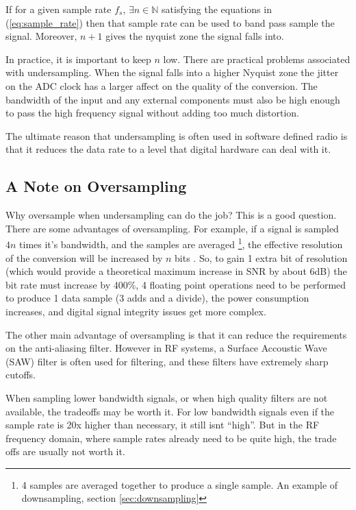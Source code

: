 \documentclass[a4paper, 12pt, notitlepage]{article}
\begin{document}
If for a given sample rate $f_s$, $\exists n \in \mathbb{N}$ satisfying the equations in (\ref{eq:sample_rate}) then that sample rate can be used to band pass sample the signal.  Moreover, $n+1$ gives the nyquist zone the signal falls into.

In practice, it is important to keep $n$ low.  There are practical problems associated with undersampling.  When the signal falls into a higher Nyquist zone the jitter on the ADC clock has a larger affect on the quality of the conversion.  The bandwidth of the input and any external components must also be high enough to pass the high frequency signal without adding too much distortion.

The ultimate reason that undersampling is often used in software defined radio is that it reduces the data rate to a level that digital hardware can deal with it.

\subsection{A Note on Oversampling}
Why oversample when undersampling can do the job\cite{why_oversample}?  This is a good question.  There are some advantages of oversampling.  For example, if a signal is sampled $4n$ times it's bandwidth, and the samples are averaged \footnote{4 samples are averaged together to produce a single sample.  An example of downsampling, section \ref{sec:downsampling}}, the effective resolution of the conversion will be increased by $n$ bits \cite{oversample_extra_bits}.  So, to gain 1 extra bit of resolution (which would provide a theoretical maximum increase in SNR by about 6dB) the bit rate must increase by 400\%, 4 floating point operations need to be performed to produce 1 data sample (3 adds and a divide), the power consumption increases, and digital signal integrity issues get more complex.

The other main advantage of oversampling is that it can reduce the requirements on the anti-aliasing filter.  However in RF systems, a Surface Accoustic Wave (SAW) filter is often used for filtering, and these filters have extremely sharp cutoffs.

When sampling lower bandwidth signals, or when high quality filters are not available, the tradeoffs may be worth it.  For low bandwidth signals even if the sample rate is 20x higher than necessary, it still isnt ``high''.  But in the RF frequency domain, where sample rates already need to be quite high, the trade offs are usually not worth it.
\end{document}
